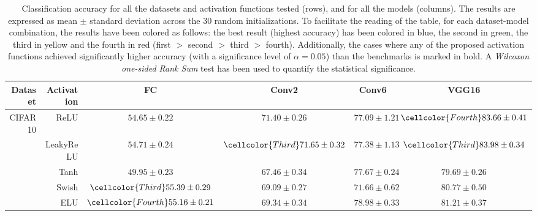 

\begin{table}[h!] \footnotesize  \setlength{\tabcolsep}{3pt}
	\caption[Classification accuracy for all the activation functions]{Classification accuracy for all the datasets and activation functions tested (rows), and for all the models (columns). The results are expressed as mean $\pm$ standard deviation across the 30 random initializations. To facilitate the reading of the table, for each dataset-model combination, the results have been colored as follows: the best result (highest accuracy) has been colored in blue, the second in green, the third in yellow and the fourth in red (\colorbox{First}{first} $>$ \colorbox{Second}{second} $>$ \colorbox{Third}{third} $>$ \colorbox{Fourth}{fourth}). Additionally, the cases where any of the proposed activation functions achieved significantly higher accuracy (with a significance level of $\alpha=0.05$) than the benchmarks is marked in bold. A \textit{Wilcoxon one-sided Rank Sum} test has been used to quantify the statistical significance.}
	\centering
	\begin{tabular}{rrcccc}
		\toprule
		 Dataset &   Activation &                     FC                      &                    Conv2                    &                    Conv6                    &                    VGG16                    \\ \midrule
		 CIFAR10 &         ReLU &              $54.65 \pm 0.22$               &              $71.40 \pm 0.26$               &              $77.09 \pm 1.21$               &     $\cellcolor{Fourth}83.66 \pm 0.41$      \\
		         &    LeakyReLU &              $54.71 \pm 0.24$               &      $\cellcolor{Third}71.65 \pm 0.32$      &              $77.38 \pm 1.13$               &      $\cellcolor{Third}83.98 \pm 0.34$      \\
		         &         Tanh &              $49.95 \pm 0.23$               &              $67.46 \pm 0.34$               &              $77.67 \pm 0.24$               &              $79.69 \pm 0.26$               \\
		         &        Swish &      $\cellcolor{Third}55.39 \pm 0.29$      &              $69.09 \pm 0.27$               &              $71.66 \pm 0.62$               &              $80.77 \pm 0.50$               \\
		         &          ELU &     $\cellcolor{Fourth}55.16 \pm 0.21$      &              $69.34 \pm 0.34$               &              $78.98 \pm 0.33$               &              $81.21 \pm 0.37$               \\

\end{tabular}
\end{table}
